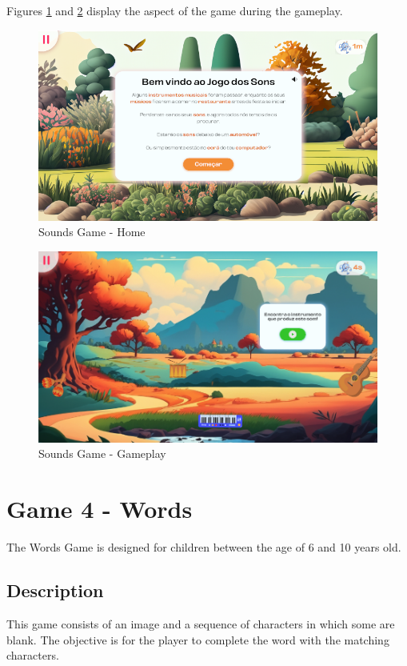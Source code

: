 Figures \ref{fig:soundsHome} and \ref{fig:soundsGameplay} display the aspect of the game during the gameplay.
\begin{figure}[H]
    \centering
    \includegraphics[width=0.9\linewidth]{Chapters/gameplay/new_screens/sounds_home.png}
    \caption{Sounds Game - Home}
    \label{fig:soundsHome}    
\end{figure}

\begin{figure}[H]
    \centering
    \includegraphics[width=0.9\linewidth]{Chapters/gameplay/SoundsGame.jpg}
    \caption{Sounds Game - Gameplay}
    \label{fig:soundsGameplay}    
\end{figure}

\section{Game 4 - Words}
\label{c3Words}

The Words Game is designed for children between the age of 6 and 10 years old.

\subsection*{Description}
This game consists of an image and a sequence of characters in which some are blank. The objective is for the player to complete the word with the matching characters.


